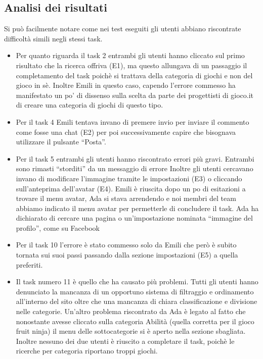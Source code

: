 \documentclass[../Report.tex]{subfiles}
\begin{document}
    \subsection{Analisi dei risultati}
    Si può facilmente notare come nei test eseguiti gli utenti abbiano riscontrate difficoltà simili negli stessi task. 
    \begin{itemize}
        \item Per quanto riguarda il task 2 entrambi gli utenti hanno cliccato sul primo risultato che la ricerca offriva (E1), ma questo allungava di un passaggio il completamento del task poichè si trattava della categoria di giochi e non del gioco in sè. Inoltre Emili in questo caso, capendo l’errore commesso ha manifestato un po’ di dissenso sulla scelta da parte dei progettisti di gioco.it di creare una categoria di giochi di questo tipo. 
        \item Per il task 4 Emili tentava invano di premere invio per inviare il commento come fosse una chat (E2) per poi successivamente capire che bisognava utilizzare il pulsante “Posta”. 
        \item Per il task 5 entrambi gli utenti hanno riscontrato errori più gravi. Entrambi sono rimasti “storditi” da un messaggio di errore 
        Inoltre gli utenti cercavano invano di modificare l’immagine tramite le impostazioni (E3) o cliccando sull’anteprima dell’avatar (E4). Emili è riuscita dopo un po di esitazioni a trovare il menu avatar, Ada si stava arrendendo e noi membri del team abbiamo indicato il menu avatar per permetterle di concludere il task. Ada ha dichiarato di cercare una pagina o un’impostazione nominata “immagine del profilo”, come su Facebook
        \item Per il task 10 l’errore è stato commesso solo da Emili che però è subito tornata sui suoi passi passando dalla sezione impostazioni (E5) a quella preferiti.
        \item Il task numero 11 è quello che ha causato più problemi. Tutti gli utenti hanno denunciato la mancanza di un opportuno sistema di filtraggio e ordinamento all’interno del sito oltre che una mancanza di chiara  classificazione e divisione nelle categorie. Un’altro problema riscontrato da Ada è legato al fatto che nonostante avesse cliccato sulla categoria Abilità (quella corretta per il gioco fruit ninja) il menu delle sottocategorie si è aperto nella sezione sbagliata. Inoltre nessuno dei due utenti è riuscito a completare il task, poichè le ricerche per categoria riportano troppi giochi.       
    \end{itemize}
    
\end{document}

